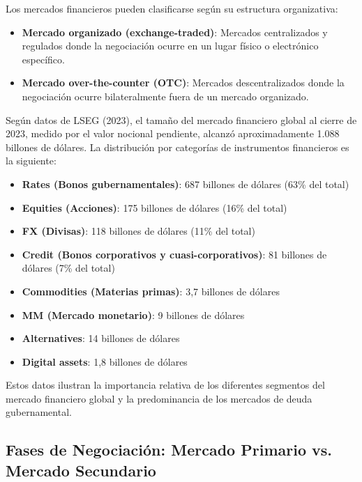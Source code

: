 \begin{definicion}
Los mercados financieros pueden clasificarse según su estructura organizativa:
\begin{itemize}
\item \textbf{Mercado organizado (exchange-traded)}: Mercados centralizados y regulados donde la negociación ocurre en un lugar físico o electrónico específico.
\item \textbf{Mercado over-the-counter (OTC)}: Mercados descentralizados donde la negociación ocurre bilateralmente fuera de un mercado organizado.
\end{itemize}
\end{definicion}

\begin{proposicion}
Según datos de LSEG (2023), el tamaño del mercado financiero global al cierre de 2023, medido por el valor nocional pendiente, alcanzó aproximadamente 1.088 billones de dólares. La distribución por categorías de instrumentos financieros es la siguiente:
\begin{itemize}
\item \textbf{Rates (Bonos gubernamentales)}: 687 billones de dólares (63\% del total)
\item \textbf{Equities (Acciones)}: 175 billones de dólares (16\% del total)
\item \textbf{FX (Divisas)}: 118 billones de dólares (11\% del total)
\item \textbf{Credit (Bonos corporativos y cuasi-corporativos)}: 81 billones de dólares (7\% del total)
\item \textbf{Commodities (Materias primas)}: 3,7 billones de dólares
\item \textbf{MM (Mercado monetario)}: 9 billones de dólares
\item \textbf{Alternatives}: 14 billones de dólares
\item \textbf{Digital assets}: 1,8 billones de dólares
\end{itemize}
Estos datos ilustran la importancia relativa de los diferentes segmentos del mercado financiero global y la predominancia de los mercados de deuda gubernamental.
\end{proposicion}

\subsection{Fases de Negociación: Mercado Primario vs. Mercado Secundario}

